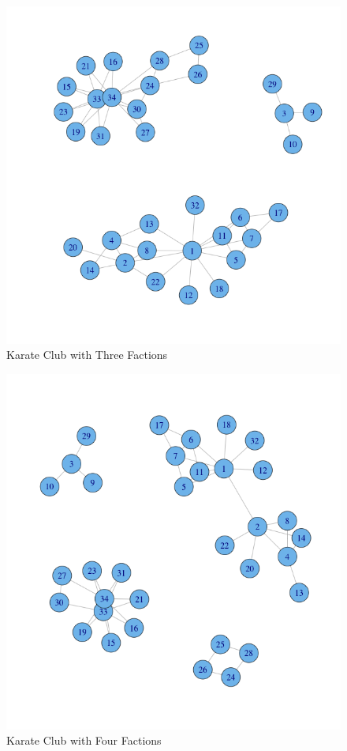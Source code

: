 \documentclass{article}
\begin{document}
\begin{figure}[H]
\centering
\includegraphics[scale=0.50]{ec/karateclub3}
\caption{Karate Club with Three Factions}
\label{after3}
\end{figure}

\begin{figure}[H]
\centering
\includegraphics[scale=0.50]{ec/karateclub4}
\caption{Karate Club with Four Factions}
\label{after4}
\end{figure}
\end{document}
